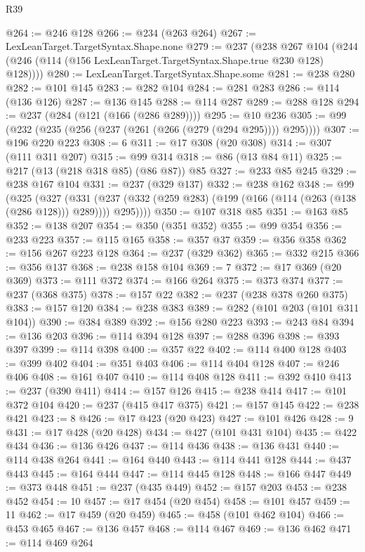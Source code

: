 \begin{lexlean}{R39}
\begin{coremodule}
@264 := @246 @128
@266 := @234 (@263 @264)
@267 := LexLeanTarget.TargetSyntax.Shape.none
@279 := @237
    (@238
      @267
      @104
      (@244 (@246 (@114 (@156 LexLeanTarget.TargetSyntax.Shape.true @230 @128) @128))))
@280 := LexLeanTarget.TargetSyntax.Shape.some
@281 := @238 @280
@282 := @101 @145
@283 := @282 @104
@284 := @281 @283
@286 := @114 (@136 @126)
@287 := @136 @145
@288 := @114 @287
@289 := @288 @128
@294 := @237 (@284 (@121 (@166 (@286 @289))))
@295 := @10 @236
@305 := @99 (@232 (@235 (@256 (@237 (@261 (@266 (@279 (@294 @295)))) @295))))
@307 := @196 @220 @223
@308 := 6
@311 := @17 @308 (@20 @308)
@314 := @307 (@111 @311 @207)
@315 := @99 @314
@318 := @86 (@13 @84 @11)
@325 := @217 (@13 (@218 @318 @85) (@86 @87)) @85
@327 := @233 @85 @245
@329 := @238 @167 @104
@331 := @237 (@329 @137)
@332 := @238 @162
@348 := @99
    (@325
      (@327
        (@331 (@237 (@332 (@259 @283) (@199 (@166 (@114 (@263 (@138 (@286 @128))) @289)))) @295))))
@350 := @107 @318 @85
@351 := @163 @85
@352 := @138 @207
@354 := @350 (@351 @352)
@355 := @99 @354
@356 := @233 @223
@357 := @115 @165
@358 := @357 @37
@359 := @356 @358
@362 := @156 @267 @223 @128
@364 := @237 (@329 @362)
@365 := @332 @215
@366 := @356 @137
@368 := @238 @158 @104
@369 := 7
@372 := @17 @369 (@20 @369)
@373 := @111 @372
@374 := @166 @264
@375 := @373 @374
@377 := @237 (@368 @375)
@378 := @157 @22
@382 := @237 (@238 @378 @260 @375)
@383 := @157 @120
@384 := @238 @383
@389 := @282 (@101 @203 (@101 @311 @104))
@390 := @384 @389
@392 := @156 @280 @223
@393 := @243 @84
@394 := @136 @203
@396 := @114 @394 @128
@397 := @288 @396
@398 := @393 @397
@399 := @114 @398
@400 := @357 @22
@402 := @114 @400 @128
@403 := @399 @402
@404 := @351 @403
@406 := @114 @404 @128
@407 := @246 @406
@408 := @161 @407
@410 := @114 @408 @128
@411 := @392 @410
@413 := @237 (@390 @411)
@414 := @157 @126
@415 := @238 @414
@417 := @101 @372 @104
@420 := @237 (@415 @417 @375)
@421 := @157 @145
@422 := @238 @421
@423 := 8
@426 := @17 @423 (@20 @423)
@427 := @101 @426
@428 := 9
@431 := @17 @428 (@20 @428)
@434 := @427 (@101 @431 @104)
@435 := @422 @434
@436 := @136 @426
@437 := @114 @436
@438 := @136 @431
@440 := @114 @438 @264
@441 := @164 @440
@443 := @114 @441 @128
@444 := @437 @443
@445 := @164 @444
@447 := @114 @445 @128
@448 := @166 @447
@449 := @373 @448
@451 := @237 (@435 @449)
@452 := @157 @203
@453 := @238 @452
@454 := 10
@457 := @17 @454 (@20 @454)
@458 := @101 @457
@459 := 11
@462 := @17 @459 (@20 @459)
@465 := @458 (@101 @462 @104)
@466 := @453 @465
@467 := @136 @457
@468 := @114 @467
@469 := @136 @462
@471 := @114 @469 @264

\end{coremodule}
\end{lexlean}
